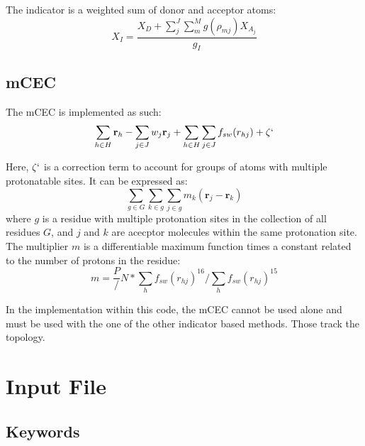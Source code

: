 \documentclass{article}
\begin{document}
The indicator is a weighted sum of donor and acceptor atoms:
\begin{equation}
	X_I = \frac{X_D + \sum_j^J \sum_m^M g(\rho_{mj})X_{A_j}}{g_I}
\end{equation}


\subsection{mCEC}
The mCEC is implemented as such:
\begin{equation}
\sum_{h \in H} \mathbf{r}_h - \sum_{j \in J} w_j \mathbf{r}_j + \sum_{h \in H} \sum_{j \in J} f_{sw}(r_{hj}) + \zeta`
\end{equation}

Here, $\zeta`$ is a correction term to account for groups of atoms with multiple protonatable sites. It can be expressed as:
\begin{equation}
\sum_{g \in G} \sum_{k\in g}\sum_{j \in g}m_k (\mathbf{r}_j - \mathbf{r}_k)
\end{equation}
where $g$ is a residue with multiple protonation sites in the collection of all residues $G$, and $j$ and $k$ are acecptor molecules within the same protonation site. 
The multiplier $m$ is a differentiable maximum function times a constant related to the number of protons in the residue:
\begin{equation}
m = \frac{P}/{N} * \sum_h f_{sw}(r_{hj})^{16} / \sum_h f_{sw}(r_{hj})^{15}
\end{equation}

In the implementation within this code, the mCEC cannot be used alone and must be used with the one of the other indicator based methods. Those track the topology.
\section{Input File}

\subsection{Keywords}
\end{document}
